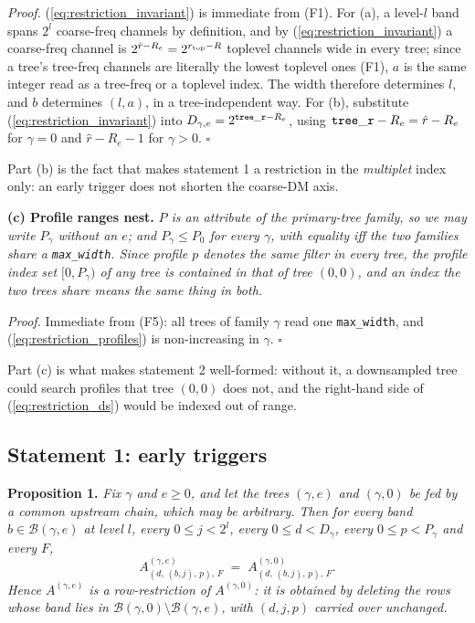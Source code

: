 \documentclass{article}
\numberwithin{equation}{section}   %
\begin{document}
\medskip
\par\noindent
{\em Proof.} (\ref{eq:restriction_invariant}) is immediate from (F1). For (a), a level-$l$
band spans $2^l$ coarse-freq channels by definition, and by (\ref{eq:restriction_invariant})
a coarse-freq channel is $2^{\hat r - R_e} = 2^{r_{\rm top}-R}$ toplevel channels wide in
every tree; since a tree's tree-freq channels are literally the lowest toplevel ones (F1),
$a$ is the same integer read as a tree-freq or a toplevel index. The width therefore
determines $l$, and $b$ determines $(l,a)$, in a tree-independent way. For (b), substitute
(\ref{eq:restriction_invariant}) into $D_{\gamma,e} = 2^{{\tt tree\_r}-R_e}$, using
${\tt tree\_r} - R_e = \hat r - R_e$ for $\gamma=0$ and $\hat r - R_e - 1$ for
$\gamma>0$. $\square$

\medskip
\par\noindent
Part (b) is the fact that makes statement 1 a restriction in the {\em multiplet} index only:
an early trigger does not shorten the coarse-DM axis.

\medskip
\par\noindent
{\bf (c) Profile ranges nest.} {\em $P$ is an attribute of the primary-tree family, so we may
write $P_\gamma$ without an $e$; and $P_\gamma \le P_0$ for every $\gamma$, with equality iff
the two families share a {\tt max\_width}. Since profile $p$ denotes the same filter in every
tree, the profile index set $[0,P_\gamma)$ of any tree is contained in that of tree $(0,0)$, and
an index the two trees share means the same thing in both.}

\medskip
\par\noindent
{\em Proof.} Immediate from (F5): all trees of family $\gamma$ read one {\tt max\_width}, and
(\ref{eq:restriction_profiles}) is non-increasing in $\gamma$. $\square$

\medskip
\par\noindent
Part (c) is what makes statement 2 well-formed: without it, a downsampled tree could search
profiles that tree $(0,0)$ does not, and the right-hand side of (\ref{eq:restriction_ds}) would
be indexed out of range.

\subsection{Statement 1: early triggers}
\label{ssec:restriction_et}

\par\noindent
{\bf Proposition 1.} {\em Fix $\gamma$ and $e \ge 0$, and let the trees $(\gamma,e)$ and
$(\gamma,0)$ be fed by a common upstream chain, which may be arbitrary. Then for every band
$b \in \mathcal{B}(\gamma,e)$ at level $l$, every $0 \le j < 2^l$, every $0 \le d < D_\gamma$,
every $0 \le p < P_\gamma$ and every $F$,}
\begin{equation}
A^{(\gamma,e)}_{(d,\,(b,j),\,p),\,F} \;=\; A^{(\gamma,0)}_{(d,\,(b,j),\,p),\,F}.
\label{eq:restriction_et}
\end{equation}
{\em Hence $A^{(\gamma,e)}$ is a row-restriction of $A^{(\gamma,0)}$: it is obtained by
deleting the rows whose band lies in $\mathcal{B}(\gamma,0) \setminus \mathcal{B}(\gamma,e)$,
with $(d,j,p)$ carried over unchanged.}
\end{document}
